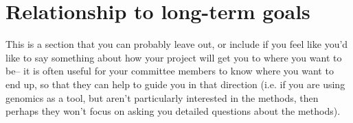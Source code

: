 \section{Relationship to long-term goals}
This is a section that you can probably leave out, or include if you feel like you'd like to say something about how your project will get you to where you want to be-- it is often useful for your committee members to know where you want to end up, so that they can help to guide you in that direction (i.e. if you are using genomics as a tool, but aren't particularly interested in the methods, then perhaps they won't focus on asking you detailed questions about the methods).